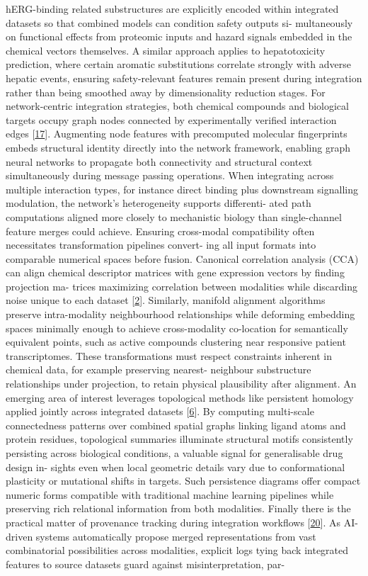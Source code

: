 \documentclass[
]{article}
\begin{document}
hERG-binding related substructures are explicitly encoded within
integrated datasets so that combined models can condition safety outputs
si- multaneously on functional effects from proteomic inputs and hazard
signals embedded in the chemical vectors themselves. A similar approach
applies to hepatotoxicity prediction, where certain aromatic
substitutions correlate strongly with adverse hepatic events, ensuring
safety-relevant features remain present during integration rather than
being smoothed away by dimensionality reduction stages. For
network-centric integration strategies, both chemical compounds and
biological targets occupy graph nodes connected by experimentally
verified interaction edges {[}\hyperref[_bookmark57]{17}{]}. Augmenting
node features with precomputed molecular fingerprints embeds structural
identity directly into the network framework, enabling graph neural
networks to propagate both connectivity and structural context
simultaneously during message passing operations. When integrating
across multiple interaction types, for instance direct binding plus
downstream signalling modulation, the network's heterogeneity supports
differenti- ated path computations aligned more closely to mechanistic
biology than single-channel feature merges could achieve. Ensuring
cross-modal compatibility often necessitates transformation pipelines
convert- ing all input formats into comparable numerical spaces before
fusion. Canonical correlation analysis (CCA) can align chemical
descriptor matrices with gene expression vectors by finding projection
ma- trices maximizing correlation between modalities while discarding
noise unique to each dataset {[}\hyperref[_bookmark42]{2}{]}. Similarly,
manifold alignment algorithms preserve intra-modality neighbourhood
relationships while deforming embedding spaces minimally enough to
achieve cross-modality co-location for semantically equivalent points,
such as active compounds clustering near responsive patient
transcriptomes. These transformations must respect constraints inherent
in chemical data, for example preserving nearest- neighbour substructure
relationships under projection, to retain physical plausibility after
alignment. An emerging area of interest leverages topological methods
like persistent homology applied jointly across integrated datasets
{[}\hyperref[_bookmark46]{6}{]}. By computing multi-scale connectedness
patterns over combined spatial graphs linking ligand atoms and protein
residues, topological summaries illuminate structural motifs
consistently persisting across biological conditions, a valuable signal
for generalisable drug design in- sights even when local geometric
details vary due to conformational plasticity or mutational shifts in
targets. Such persistence diagrams offer compact numeric forms
compatible with traditional machine learning pipelines while preserving
rich relational information from both modalities. Finally there is the
practical matter of provenance tracking during integration workflows
{[}\hyperref[_bookmark60]{20}{]}. As AI-driven systems automatically
propose merged representations from vast combinatorial possibilities
across modalities, explicit logs tying back integrated features to
source datasets guard against misinterpretation, par-
\end{document}
